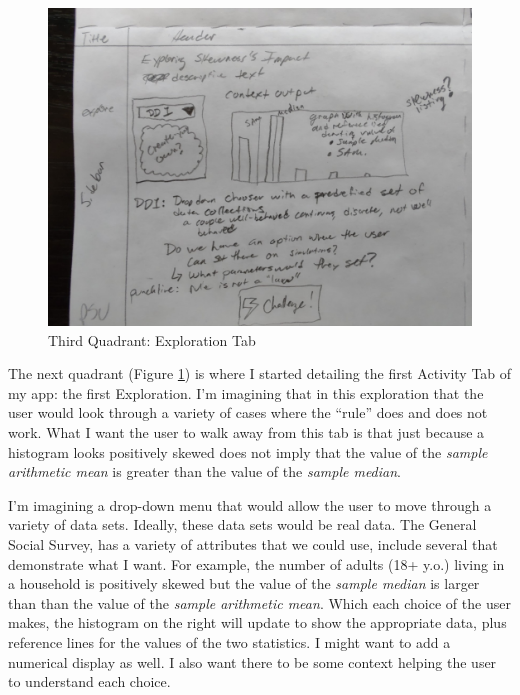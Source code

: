 \documentclass[
]{book}
\begin{document}
\begin{figure}

{\centering \includegraphics[width=22.22in]{images/planSketch4-Explore} 

}

\caption{Third Quadrant: Exploration Tab}\label{fig:planSketchExplore}
\end{figure}

The next quadrant (Figure \ref{fig:planSketchExplore}) is where I started detailing the first Activity Tab of my app: the first Exploration. I'm imagining that in this exploration that the user would look through a variety of cases where the ``rule'' does and does not work. What I want the user to walk away from this tab is that just because a histogram looks positively skewed does not imply that the value of the \emph{sample arithmetic mean} is greater than the value of the \emph{sample median}.

I'm imagining a drop-down menu that would allow the user to move through a variety of data sets. Ideally, these data sets would be real data. The General Social Survey, has a variety of attributes that we could use, include several that demonstrate what I want. For example, the number of adults (18+ y.o.) living in a household is positively skewed but the value of the \emph{sample median} is larger than than the value of the \emph{sample arithmetic mean}. Which each choice of the user makes, the histogram on the right will update to show the appropriate data, plus reference lines for the values of the two statistics. I might want to add a numerical display as well. I also want there to be some context helping the user to understand each choice.
\end{document}
